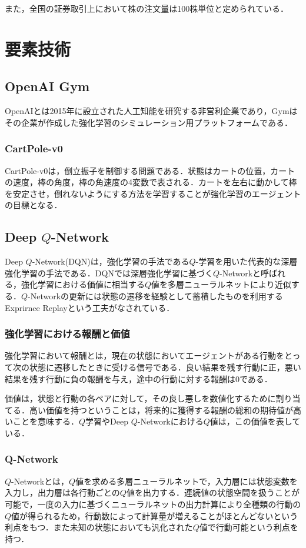 \documentclass[twocolumn]{jarticle}
\begin{document}
    また，全国の証券取引上において株の注文量は100株単位と定められている．

\section{要素技術}

    \subsection{OpenAI Gym}
    OpenAIとは2015年に設立された人工知能を研究する非営利企業であり，Gym\cite{Gym}はその企業が作成した強化学習のシミュレーション用プラットフォームである．

        \subsubsection{CartPole-v0}
        CartPole-v0は，倒立振子を制御する問題である．状態はカートの位置，カートの速度，棒の角度，棒の角速度の4変数で表される．カートを左右に動かして棒を安定させ，倒れないようにする方法を学習することが強化学習のエージェントの目標となる．

    \subsection{Deep $Q$-Network}
    Deep $Q$-Network(DQN)は，強化学習の手法である$Q$-学習を用いた代表的な深層強化学習の手法である．DQNでは深層強化学習に基づく$Q$-Networkと呼ばれる，強化学習における価値に相当する$Q$値を多層ニューラルネットにより近似する．$Q$-Networkの更新には状態の遷移を経験として蓄積したものを利用するExprirnce Replayという工夫がなされている．

        \subsubsection{強化学習における報酬と価値}
        強化学習において報酬とは，現在の状態においてエージェントがある行動をとって次の状態に遷移したときに受ける信号である．良い結果を残す行動に正，悪い結果を残す行動に負の報酬を与え，途中の行動に対する報酬は0である．

        価値は，状態と行動の各ペアに対して，その良し悪しを数値化するために割り当てる．高い価値を持つということは，将来的に獲得する報酬の総和の期待値が高いことを意味する．$Q$学習やDeep $Q$-Networkにおける$Q$値は，この価値を表している．

        \subsubsection{Q-Network}
        $Q$-Networkとは，$Q$値を求める多層ニューラルネットで，入力層には状態変数を入力し，出力層は各行動ごとの$Q$値を出力する．連続値の状態空間を扱うことが可能で，一度の入力に基づくニューラルネットの出力計算により全種類の行動の$Q$値が得られるため，行動数によって計算量が増えることがほとんどないという利点をもつ．また未知の状態においても汎化された$Q$値で行動可能という利点を持つ．
\end{document}

